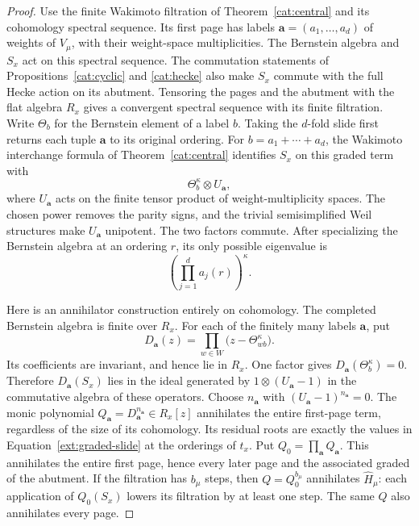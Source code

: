 \begin{proof}
 Use the finite Wakimoto filtration of
 Theorem~\ref{cat:central} and its cohomology spectral sequence.
 Its first page has labels $\mathbf a=(a_1,\ldots,a_d)$ of weights
 of $V_\mu$, with their weight-space multiplicities.  The Bernstein
 algebra and $S_x$ act on this spectral sequence.  The commutation
 statements of Propositions~\ref{cat:cyclic} and \ref{cat:hecke}
 also make $S_x$ commute with the full Hecke action on its abutment.
 Tensoring the pages and the abutment with the flat algebra $R_x$
 gives a convergent spectral sequence with its finite filtration.
 Write $\Theta_b$ for the Bernstein element of a label $b$.
 Taking the $d$-fold slide first returns each tuple $\mathbf a$ to
 its original ordering.  For $b=a_1+\cdots+a_d$, the Wakimoto
 interchange formula of Theorem~\ref{cat:central} identifies $S_x$
 on this graded term with
 \[
                  \Theta_b^\kappa\otimes U_{\mathbf a},
 \]
 where $U_{\mathbf a}$ acts on the finite tensor product of
 weight-multiplicity spaces.  The chosen power removes the parity
 signs, and the trivial semisimplified Weil structures make
 $U_{\mathbf a}$ unipotent.  The two factors commute.
 After specializing the Bernstein algebra at an ordering $r$,
 its only possible eigenvalue is
 \begin{equation}\label{ext:graded-slide}
                     \left(\prod_{j=1}^{d}a_j(r)\right)^\kappa.
 \end{equation}

 Here is an annihilator construction entirely on cohomology.
 The completed Bernstein algebra is finite over $R_x$.
 For each of the finitely many labels $\mathbf a$, put
 \[
      D_{\mathbf a}(z)=\prod_{w\in W}
           \bigl(z-\Theta_{wb}^\kappa\bigr).
 \]
 Its coefficients are invariant, and hence lie in $R_x$.
 One factor gives $D_{\mathbf a}(\Theta_b^\kappa)=0$.
 Therefore $D_{\mathbf a}(S_x)$ lies in the ideal generated by
 $1\otimes(U_{\mathbf a}-1)$ in the commutative algebra of these
 operators.  Choose $n_{\mathbf a}$ with
 $(U_{\mathbf a}-1)^{n_{\mathbf a}}=0$.  The monic polynomial
 $Q_{\mathbf a}=D_{\mathbf a}^{n_{\mathbf a}}\in R_x[z]$
 annihilates the entire first-page term, regardless of the size
 of its cohomology.  Its residual roots are exactly the values in
 Equation~\eqref{ext:graded-slide} at the orderings of $t_x$.
 Put $Q_0=\prod_{\mathbf a}Q_{\mathbf a}$.  This annihilates the
 entire first page, hence every later page and the associated graded
 of the abutment.  If the filtration has $b_\mu$ steps, then
 $Q=Q_0^{b_\mu}$ annihilates $\widehat H_\mu$: each application of
 $Q_0(S_x)$ lowers its filtration by at least one step.  The same
 $Q$ also annihilates every page.


\end{proof}
